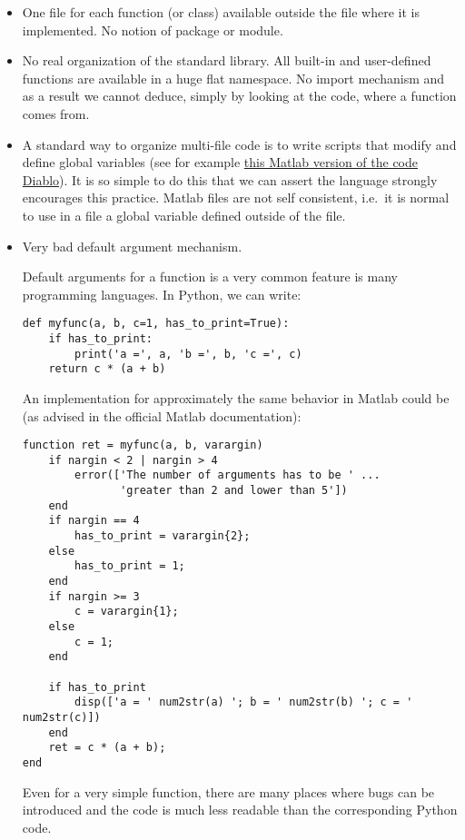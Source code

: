\begin{itemize}
\item One file for each function (or class) available outside the file where it
is implemented. No notion of package or module.

\item No real organization of the standard library. All built-in and
user-defined functions are available in a huge flat namespace. No import
mechanism and as a result we cannot deduce, simply by looking at the code,
where a function comes from.

\item A standard way to organize multi-file code is to write scripts that
modify and define global variables (see for example
\href{https://www.damtp.cam.ac.uk/user/jrt51/files/diablo\_mat.tar.gz}{%
this Matlab version of the code Diablo}).  It is so simple to do this that we
can assert the language strongly encourages this practice.  Matlab files are
not self consistent, i.e.\ it is normal to use in a file a global variable
defined outside of the file.

\item Very bad default argument mechanism.

Default arguments for a function is a very common feature is many programming
languages. In Python, we can write:
\begin{verbatim}
def myfunc(a, b, c=1, has_to_print=True):
    if has_to_print:
        print('a =', a, 'b =', b, 'c =', c)
    return c * (a + b)
\end{verbatim}

An implementation for approximately the same behavior in Matlab could be (as
advised in the official Matlab documentation):
\begin{verbatim}
function ret = myfunc(a, b, varargin)
    if nargin < 2 | nargin > 4
        error(['The number of arguments has to be ' ...
               'greater than 2 and lower than 5'])
    end
    if nargin == 4
        has_to_print = varargin{2};
    else
        has_to_print = 1;
    end
    if nargin >= 3
        c = varargin{1};
    else
        c = 1;
    end

    if has_to_print
        disp(['a = ' num2str(a) '; b = ' num2str(b) '; c = ' num2str(c)])
    end
    ret = c * (a + b);
end
\end{verbatim}
Even for a very simple function, there are many places where bugs can be
introduced and the code is much less readable than the corresponding Python
code.


\end{itemize}
